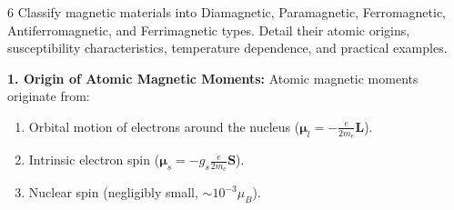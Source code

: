 \begin{theoryq}{6}
Classify magnetic materials into Diamagnetic, Paramagnetic, Ferromagnetic, Antiferromagnetic, and Ferrimagnetic types. Detail their atomic origins, susceptibility characteristics, temperature dependence, and practical examples.
\end{theoryq}
\begin{theorysol}
\textbf{1. Origin of Atomic Magnetic Moments:}
Atomic magnetic moments originate from:
\begin{enumerate}
\item Orbital motion of electrons around the nucleus ($\mathbf{\mu}_l = -\frac{e}{2m_e}\mathbf{L}$).
\item Intrinsic electron spin ($\mathbf{\mu}_s = -g_s \frac{e}{2m_e}\mathbf{S}$).
\item Nuclear spin (negligibly small, $\sim 10^{-3}\mu_B$).
\end{enumerate}


\end{theorysol}
